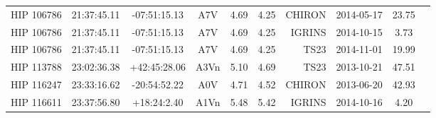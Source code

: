 \begin{scriptsize}
\begin{longtable}{lcccccrccc}
 HIP 106786 &  21:37:45.11 &  -07:51:15.13 &         A7V & 4.69 &     4.25 &     CHIRON &  2014-05-17 &   23.75 \\
 HIP 106786 &  21:37:45.11 &  -07:51:15.13 &         A7V & 4.69 &     4.25 &     IGRINS &  2014-10-15 &    3.73 \\
 HIP 106786 &  21:37:45.11 &  -07:51:15.13 &         A7V & 4.69 &     4.25 &       TS23 &  2014-11-01 &   19.99 \\
 HIP 113788 &  23:02:36.38 &  +42:45:28.06 &        A3Vn & 5.10 &     4.69 &       TS23 &  2013-10-21 &   47.51 \\
 HIP 116247 &  23:33:16.62 &  -20:54:52.22 &         A0V & 4.71 &     4.52 &     CHIRON &  2013-06-20 &   42.93 \\
 HIP 116611 &  23:37:56.80 &   +18:24:2.40 &        A1Vn & 5.48 &     5.42 &     IGRINS &  2014-10-16 &    4.20 \\
 

\end{longtable}
\end{scriptsize}





